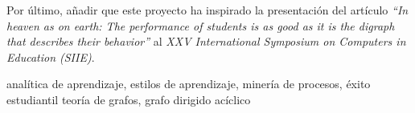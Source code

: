 Por último, añadir que este proyecto ha inspirado la presentación del artículo \emph{``In heaven as on earth: The performance of students is as good as it is the digraph that describes their behavior''} \cite{SIIE23} al \emph{XXV International Symposium on Computers in Education (SIIE)}.

\small{ analítica de aprendizaje, \; estilos de aprendizaje, \; minería de procesos, \; éxito estudiantil \; teoría de grafos, \; grafo dirigido acíclico}

\newpage